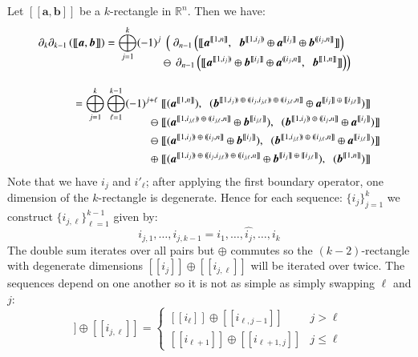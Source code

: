 Let $[\![\boldsymbol{a}, \boldsymbol{b}]\!]$ be a $k$-rectangle in $\mathbb{R}^n$.
Then we have:
\begin{align*}
	\partial_k \partial_{k-1} \left( [\![ \boldsymbol{a}, \boldsymbol{b} ]\!] \right) 
	= \bigoplus_{j=1}^k (-1)^j 
		& \;  \left( \; \partial_{n-1} \left(	
			[\![ 	\boldsymbol{a}^{[\![1,n]\!]}, \;\;
				\boldsymbol{b}^{[\![1,i_j)\!)}
					\oplus \boldsymbol{a}^{[\![i_j]\!]}
					\oplus \boldsymbol{b}^{(\!(i_j,n]\!]} 
			]\!] 
		\right) \right. \notag\\[-1em]
		& \ominus \; \left. \! \partial_{n-1} \left(
			[\![ 	\boldsymbol{a}^{[\![1,i_j)\!)}
					\oplus \boldsymbol{b}^{[\![i_j]\!]}
					\oplus \boldsymbol{a}^{(\!(i_j,n]\!]} , \;\;
				\boldsymbol{b}^{[\![1,n]\!]}
			]\!] 
		\right)\right) \\[1em]
	= \bigoplus_{j=1}^k \bigoplus_{\ell=1}^{k-1} (-1)^{j+\ell}
		\;&
			[\![ 	(\boldsymbol{a}^{[\![1,n]\!]}), \;\;
				(\boldsymbol{b}^{[\![1,i_j)\!) \;\oplus\; (\!(i_j,i_{j,\ell})\!) \;\oplus\; (\!(i_{j,\ell},n]\!]}
					\oplus \boldsymbol{a}^{[\![i_j]\!] \;\oplus\; [\![i_{j,\ell}]\!]})
			]\!] \notag\\[-1em]
		\ominus \;&
			[\![ 	(\boldsymbol{a}^{[\![1,i_{j,\ell})\!) \;\oplus\; (\!(i_{j,\ell},n]\!]}
					\oplus \boldsymbol{b}^{[\![i_{j,\ell}]\!]}), \;\;
				(\boldsymbol{b}^{[\![1,i_j)\!) \;\oplus\; (\!(i_j,n]\!]}
					\oplus \boldsymbol{a}^{[\![i_j]\!]})
			]\!] \notag\\
		\ominus \; &
			[\![ 	(\boldsymbol{a}^{[\![1,i_j)\!) \;\oplus\; (\!(i_j,n]\!]}
					\oplus \boldsymbol{b}^{[\![i_j]\!]}), \;\;
				(\boldsymbol{b}^{[\![1,i_{j,\ell})\!) \;\oplus\; (\!(i_{j,\ell},n]\!]}
					\oplus \boldsymbol{a}^{[\![i_{j,\ell}]\!]})
			]\!] \notag\\
		\oplus \;&
			[\![ 	(\boldsymbol{a}^{[\![1,i_j)\!) \;\oplus\; (\!(i_j,i_{j,\ell})\!) \;\oplus\; (\!(i_{j,\ell},n]\!]}
					\oplus \boldsymbol{b}^{[\![i_j]\!] \;\oplus\; [\![i_{j,\ell}]\!]}), \;\;
				(\boldsymbol{b}^{[\![1,n]\!]})
			]\!] 
\end{align*}
Note that we have $i_j$ and $i'_\ell$; after applying the first boundary operator, 
one dimension of the $k$-rectangle is degenerate.
Hence for each sequence: $\{i_j\}_{j=1}^k$ we construct $\{i_{j,\ell}\}_{\ell=1}^{k-1}$ given by:
\begin{equation*}
	i_{j,1} , \ldots, i_{j,k-1} = i_1, \ldots, \widehat{i_j}, \ldots, i_k
\end{equation*}
The double sum iterates over all pairs but $\oplus$ commutes so the $(k-2)$-rectangle with degenerate dimensions 
$[\![i_j]\!] \oplus [\![i_{j,\ell}]\!]$ will be iterated over twice. 
The sequences depend on one another so it is not as simple as simply swapping $\ell$ and $j$:
\begin{equation*}
   [\![i_j]\!] \oplus [\![i_{j,\ell}]\!] =
     \begin{cases}
       [\![i_\ell]\!] \oplus [\![i_{\ell,j-1}]\!] & j > \ell \\
       [\![i_{\ell+1}]\!] \oplus [\![i_{\ell+1,j}]\!] & j \leq \ell
     \end{cases}
\end{equation*}


